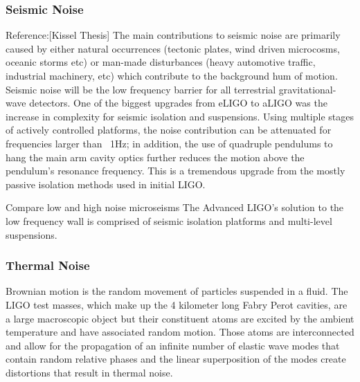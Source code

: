 		\subsubsection{Seismic Noise}
		Reference:[Kissel Thesis]
		The main contributions to seismic noise are primarily caused by either natural occurrences  (tectonic plates, wind driven microcosms, oceanic storms etc) or man-made disturbances (heavy automotive traffic, industrial machinery, etc) which contribute to the background hum of motion.  Seismic noise will be the low frequency barrier for all terrestrial gravitational-wave detectors.  One of the biggest upgrades from eLIGO to aLIGO was the increase in complexity for seismic isolation and suspensions.  Using multiple stages of actively controlled platforms, the noise contribution can be attenuated for frequencies larger than ~1Hz;  in addition, the use of quadruple pendulums to hang the main arm cavity optics further reduces the motion above the pendulum's resonance frequency. This is a tremendous upgrade from the mostly passive isolation methods used in initial LIGO.
		
		Compare low and high noise microseisms
		\cite{BlairBook}
		The Advanced LIGO's solution to the low frequency wall is comprised of seismic isolation platforms and multi-level suspensions.
		
		\cite{driggers_global}
		
		\cite{fabrice_sei1}
		
		\cite{fabrice_sei2}
		
		\cite{fabrice_strat}
		
		\cite{sei_isol}
		
		\cite{Hang_LF}
		
		\cite{Fritschel_alignment}
		
		\subsubsection{Thermal Noise}
		Brownian motion \cite{brownian_einstein} is the random movement of particles suspended in a fluid.  The LIGO test masses, which make up the 4 kilometer long Fabry Perot cavities, are a large macroscopic object but their constituent atoms are excited by the ambient temperature and have associated random motion. Those atoms are interconnected and allow for the propagation of an infinite number of elastic wave modes that contain random relative phases and the linear superposition of the modes create distortions that result in thermal noise.	
		
